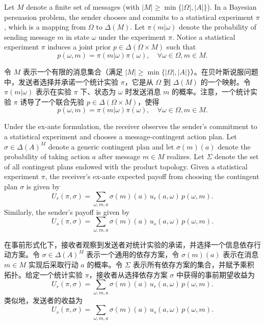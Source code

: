 \documentclass[12pt,a4paper]{article}
\theoremstyle{definition}
\theoremstyle{remark}
\newenvironment{original}{%
    \par\medskip\noindent%
    \begin{tcolorbox}[%
        colback=white,%
        colframe=black!50,%
        title=\textbf{Original English},%
        fonttitle=\small\bfseries,%
        left=0pt, right=0pt, top=2pt, bottom=2pt,%
        boxrule=0.5pt,%
        arc=0pt,%
        outer arc=0pt%
    ]%
    \small%
}{%
    \end{tcolorbox}%
}
\newenvironment{translation}{%
    \par\smallskip\noindent%
    \begin{tcolorbox}[%
        colback=blue!3!white,%
        colframe=blue!40!black,%
        title=\textbf{中文翻译},%
        fonttitle=\small\bfseries,%
        left=0pt, right=0pt, top=2pt, bottom=2pt,%
        boxrule=0.5pt,%
        arc=0pt,%
        outer arc=0pt%
    ]%
    \small\color{blue!60!black}%
}{%
    \end{tcolorbox}\medskip%
}
\begin{document}
\begin{original}
Let $M$ denote a finite set of messages (with $|M| \geq \min\{|\Omega|, |A|\}$). In a Bayesian persuasion problem, the sender chooses and commits to a statistical experiment $\pi$, which is a mapping from $\Omega$ to $\Delta(M)$. Let $\pi(m|\omega)$ denote the probability of sending message $m$ in state $\omega$ under the experiment $\pi$. Notice a statistical experiment $\pi$ induces a joint prior $p \in \Delta(\Omega \times M)$ such that
\[
p(\omega, m) = \pi(m|\omega)\pi(\omega), \quad \forall \omega \in \Omega, m \in M.
\]
\end{original}
\begin{translation}
令 $M$ 表示一个有限的消息集合（满足 $|M| \geq \min\{|\Omega|, |A|\}$）。在贝叶斯说服问题中，发送者选择并承诺一个统计实验 $\pi$，它是从 $\Omega$ 到 $\Delta(M)$ 的一个映射。令 $\pi(m|\omega)$ 表示在实验 $\pi$ 下、状态为 $\omega$ 时发送消息 $m$ 的概率。注意，一个统计实验 $\pi$ 诱导了一个联合先验 $p \in \Delta(\Omega \times M)$，使得
\[
p(\omega, m) = \pi(m|\omega)\pi(\omega), \quad \forall \omega \in \Omega, m \in M.
\]
\end{translation}

\begin{original}
Under the ex-ante formulation, the receiver observes the sender's commitment to a statistical experiment and chooses a message-contingent action plan. Let $\sigma \in \Delta(A)^M$ denote a generic contingent plan and let $\sigma(m)(a)$ denote the probability of taking action $a$ after message $m \in M$ realizes. Let $\Sigma$ denote the set of all contingent plans endowed with the product topology. Given a statistical experiment $\pi$, the receiver's ex-ante expected payoff from choosing the contingent plan $\sigma$ is given by
\[
U_r(\pi, \sigma) = \sum_{\omega, m, a} \sigma(m)(a) \, u_r(a, \omega) \, p(\omega, m).
\]
Similarly, the sender's payoff is given by
\[
U_s(\pi, \sigma) = \sum_{\omega, m, a} \sigma(m)(a) \, u_s(a, \omega) \, p(\omega, m).
\]
\end{original}
\begin{translation}
在事前形式化下，接收者观察到发送者对统计实验的承诺，并选择一个信息依存行动方案。令 $\sigma \in \Delta(A)^M$ 表示一个通用的依存方案，令 $\sigma(m)(a)$ 表示在消息 $m \in M$ 实现后采取行动 $a$ 的概率。令 $\Sigma$ 表示所有依存方案的集合，并赋予乘积拓扑。给定一个统计实验 $\pi$，接收者从选择依存方案 $\sigma$ 中获得的事前期望收益为
\[
U_r(\pi, \sigma) = \sum_{\omega, m, a} \sigma(m)(a) \, u_r(a, \omega) \, p(\omega, m).
\]
类似地，发送者的收益为
\[
U_s(\pi, \sigma) = \sum_{\omega, m, a} \sigma(m)(a) \, u_s(a, \omega) \, p(\omega, m).
\]
\end{translation}
\end{document}
